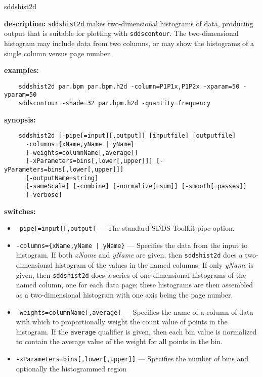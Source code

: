 \begin{sddsprog}{sddshist2d}
  \item \textbf{description:} \verb|sddshist2d| makes two-dimensional histograms of data, producing
    output that is suitable for plotting with \verb|sddscontour|. The two-dimensional histogram
    may include data from two columns, or may show the histograms of a single column versus
    page number.
  \item \textbf{examples:}
    \begin{verbatim}
    sddshist2d par.bpm par.bpm.h2d -column=P1P1x,P1P2x -xparam=50 -yparam=50
    sddscontour -shade=32 par.bpm.h2d -quantity=frequency
    \end{verbatim}
  \item \textbf{synopsis:}
    \begin{verbatim}
    sddshist2d [-pipe[=input][,output]] [inputfile] [outputfile]
      -columns={xName,yName | yName}
      [-weights=columnName[,average]]
      [-xParameters=bins[,lower[,upper]]] [-yParameters=bins[,lower[,upper]]]
      [-outputName=string]
      [-sameScale] [-combine] [-normalize[=sum]] [-smooth[=passes]]
      [-verbose]
    \end{verbatim}
  \item \textbf{switches:}
    \begin{itemize}
      \item \verb|-pipe[=input][,output]| --- The standard SDDS Toolkit pipe option.
      \item \verb!-columns={xName,yName | yName}! --- Specifies the data from the input to histogram. If both
        {\em xName} and {\em yName} are given, then \verb|sddshist2d| does a two-dimensional histogram of the values in
        the named columns. If only {\em yName} is given, then \verb|sddshist2d| does a series of one-dimensional histograms
        of the named column, one for each data page; these histograms are then assembled as a two-dimensional histogram
        with one axis being the page number.
      \item \verb|-weights=columnName[,average]| --- Specifies the name of a column of data with which to proportionally
        weight the count value of points in the histogram. If the \verb|average| qualifier is given, then each bin value
        is normalized to contain the average value of the weight for all points in the bin.
      \item \verb|-xParameters=bins[,lower[,upper]]| --- Specifies the number of bins and optionally the histogrammed region

\end{itemize}
\end{sddsprog}
